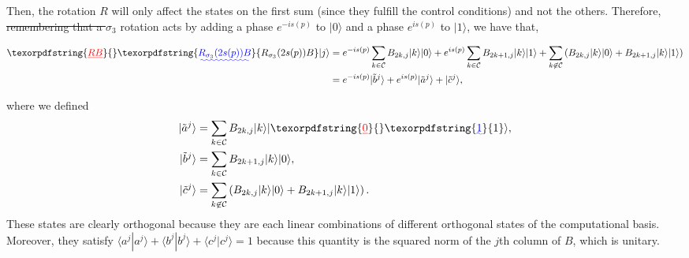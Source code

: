 \documentclass[10pt,letterpaper]{article} %
\providecommand{\DIFaddtex}[1]{{\protect\color{blue}\uwave{#1}}} %
\providecommand{\DIFdeltex}[1]{{\protect\color{red}\sout{#1}}}                      %
\providecommand{\DIFaddbegin}{} %
\providecommand{\DIFaddend}{} %
\providecommand{\DIFdelbegin}{} %
\providecommand{\DIFdelend}{} %
\providecommand{\DIFadd}[1]{\texorpdfstring{\DIFaddtex{#1}}{#1}} %
\providecommand{\DIFdel}[1]{\texorpdfstring{\DIFdeltex{#1}}{}} %
\newcommand{\DIFscaledelfig}{0.5}
\newlength{\DIFdelgraphicswidth} %
\newlength{\DIFdelgraphicsheight} %
\newcommand{\DIFaddincludegraphics}[2][]{{\color{blue}\fbox{\DIFOincludegraphics[#1]{#2}}}} %
\newcommand{\DIFdelincludegraphics}[2][]{%
\sbox{\DIFdelgraphicsbox}{\DIFOincludegraphics[#1]{#2}}%
\settoboxwidth{\DIFdelgraphicswidth}{\DIFdelgraphicsbox} %
\settoboxtotalheight{\DIFdelgraphicsheight}{\DIFdelgraphicsbox} %
\scalebox{\DIFscaledelfig}{%
\parbox[b]{\DIFdelgraphicswidth}{\usebox{\DIFdelgraphicsbox}\\[-\baselineskip] \rule{\DIFdelgraphicswidth}{0em}}\llap{\resizebox{\DIFdelgraphicswidth}{\DIFdelgraphicsheight}{%
\setlength{\unitlength}{\DIFdelgraphicswidth}%
\begin{picture}(1,1)%
\thicklines\linethickness{2pt} %
{\color[rgb]{1,0,0}\put(0,0){\framebox(1,1){}}}%
{\color[rgb]{1,0,0}\put(0,0){\line( 1,1){1}}}%
{\color[rgb]{1,0,0}\put(0,1){\line(1,-1){1}}}%
\end{picture}%
}\hspace*{3pt}}} %
} %
\DeclareRobustCommand{\DIFaddbegin}{\DIFOaddbegin \let\includegraphics\DIFaddincludegraphics} %
\DeclareRobustCommand{\DIFaddend}{\DIFOaddend \let\includegraphics\DIFOincludegraphics} %
\DeclareRobustCommand{\DIFdelbegin}{\DIFOdelbegin \let\includegraphics\DIFdelincludegraphics} %
\DeclareRobustCommand{\DIFdelend}{\DIFOaddend \let\includegraphics\DIFOincludegraphics} %
\begin{document}
Then, the rotation $R$ will only affect the states on the first sum (since they fulfill the control conditions)
and not the others. Therefore,  
\DIFdelbegin \DIFdel{remembering that a $\sigma_3$ }\DIFdelend \DIFaddbegin \DIFadd{using that a $R_{\sigma_3}(2s(p))$ }\DIFaddend rotation acts by adding a phase $e^{-is(p)}$ to $|0\rangle$
and a phase $e^{is(p)}$ to $|1\rangle$, we have that,
\DIFaddbegin \begin{small}
\DIFaddend \begin{align}
\DIFdelbegin \DIFdel{RB}\DIFdelend \DIFaddbegin \DIFadd{R_{\sigma_3}(2s(p))B}\DIFaddend |j\rangle& = e^{-is(p)} \sum_{k \in \mathcal{C}} B_{2k,j} |k\rangle |0\rangle + e^{is(p)} \sum_{k \in \mathcal{C}} B_{2k+1,j} |k\rangle |1\rangle 
+ \sum_{k \not\in \mathcal{C}} \left( B_{2k,j} |k\rangle|0\rangle  + B_{2k+1,j} |k \rangle |1\rangle  \right) \nonumber \\
& = e^{-is(p)} |\tilde{b}^{j}\rangle + e^{is(p)} |\tilde{a}^j\rangle + |\tilde{c}^j\rangle,
\end{align}
\DIFaddbegin \end{small}
\DIFaddend where we defined
\begin{align*}
|\tilde{a}^j \rangle &= \sum_{k \in \mathcal{C}} B_{2k,j}|k\rangle|\DIFdelbegin \DIFdel{0}\DIFdelend \DIFaddbegin \DIFadd{1}\DIFaddend \rangle,\\
|\tilde{b}^j\rangle &= \sum_{k \in \mathcal{C}} B_{2k+1,j} |k\rangle |0 \rangle,\\
|\tilde{c}^j\rangle &= \sum_{k \not\in \mathcal{C}}\left( B_{2k,j} |k\rangle|0\rangle+ B_{2k+1,j} |k \rangle |1\rangle  \right).
\end{align*}
These states are clearly orthogonal because they are each linear combinations of different 
orthogonal states of the computational basis. 
Moreover, they satisfy  $\langle a^j| a^j\rangle + \langle b^j| b^j\rangle + \langle c^j| c^j\rangle = 1$ because this quantity is the squared norm of the $j$th column of $B$, 
which is unitary. 
\end{document}

